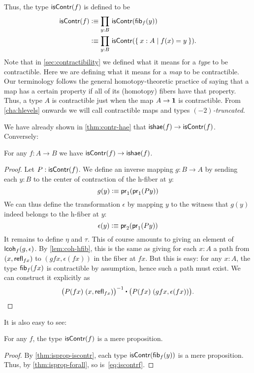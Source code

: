 Thus, the type $\mathsf{isContr}(f)$ is defined to be
\begin{align}
  \iscontr(f) &\defeq \prd{y:B} \iscontr(\hfib f y)\\
  &\defeq \prd{y:B} \iscontr (\setof{x:A | f(x) = y}).\label{eq:iscontrf}
\end{align}
Note that in \autoref{sec:contractibility} we defined what it means for a \emph{type} to be contractible.
Here we are defining what it means for a \emph{map} to be contractible.
Our terminology follows the general homotopy-theoretic practice of saying that a map has a certain property if all of its (homotopy) fibers have that property.
Thus, a type $A$ is contractible just when the map $A\to\mathbf{1}$ is contractible.
From \autoref{cha:hlevels} onwards we will call contractible maps and types \emph{$(-2)$-truncated}.

We have already shown in \autoref{thm:contr-hae} that $\mathsf{ishae}(f) \to \mathsf{isContr}(f)$.
Conversely:

\begin{thm}\label{thm:lequiv-contr-hae}
For any $f:A\to B$ we have ${\mathsf{isContr}(f)} \to {\ensuremath{\mathsf{ishae}}(f)}$.
\end{thm}
\begin{proof}
Let $P : \mathsf{isContr}(f)$. We define an inverse mapping $g : B \to A$ by sending each $y : B$ to the center of contraction of the h-fiber at $y$:
\[ g(y) \vcentcolon\equiv \mathsf{pr}_{1}(\mathsf{pr}_{1}(Py)) \]
We can thus define the transformation $\epsilon$ by mapping $y$ to the witness that $g(y)$ indeed belongs to the h-fiber at $y$:
\[ \epsilon(y) \vcentcolon\equiv \mathsf{pr}_{2}(\mathsf{pr}_{1}(P y)) \]
It remains to define $\eta$ and $\tau$. This of course amounts to giving an element of $\mathsf{lcoh}_{f}(g,\epsilon)$. By \autoref{lem:coh-hfib}, this is the same as giving for each $x:A$ a path from $(x,\mathsf{refl}_{fx})$ to $(gfx,\epsilon(fx))$ in the fiber at $fx$. But this is easy: for any $x : A$, the type ${\mathsf{fib}}_{f}(fx)$ 
is contractible by assumption, hence such a path must exist. We can construct it explicitly as
\[\opp{\big(P(fx) \; (x,\refl{fx})\big)} \ct \big(P(fx) \; (gfx,\epsilon(fx))\big). \qedhere \]
\end{proof}

It is also easy to see:

\begin{lem}\label{thm:contr-hprop}
  For any $f$, the type $\mathsf{isContr}(f)$ is a mere proposition.
\end{lem}
\begin{proof}
  By \autoref{thm:isprop-iscontr}, each type $\mathsf{isContr} ({\mathsf{fib}}_{f}(y))$ is a mere proposition.
  Thus, by \autoref{thm:isprop-forall}, so is~\eqref{eq:iscontrf}.
\end{proof}


